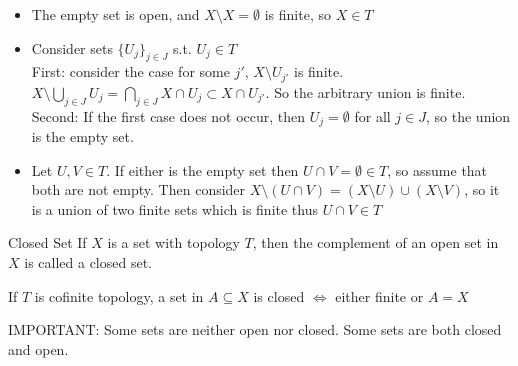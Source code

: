 \begin{proppf}
    \begin{itemize}
        \item The empty set is open, and $X\setminus X = \emptyset$ is finite, so $X \in T$
        \item Consider sets $\{U_j\}_{j \in J}$ s.t. $U_j \in T$\\
        First: consider the case for some $j'$, $X \setminus U_{j'}$ is finite.\\
        $X \setminus \bigcup_{j \in J} U_j=\bigcap_{j \in J}X \cap U_j \subset X \cap U_{j'}$. So the arbitrary union is finite.\\
        Second: If the first case does not occur, then $U_j = \emptyset$ for all $j \in J$, so the union is the empty set.
        \item Let $U,V \in T$. If either is the empty set then $U \cap V = \emptyset \in T$, so assume that both are not empty. Then consider $X\setminus(U \cap V)=(X\setminus U) \cup (X \setminus V)$, so it is a union of two finite sets
        which is finite thus $U \cap V \in T$
    \end{itemize}
\end{proppf}

\begin{definition}{Closed Set}{}
    If $X$ is a set with topology $T$, then the complement of an open set in $X$ is called a closed set.
\end{definition}

\begin{example*}{}{}
    If $T$ is cofinite topology, a set in $A \subseteq X$ is closed $\iff$ either finite or $A = X$
\end{example*}
{\LARGE IMPORTANT:}
Some sets are neither open nor closed. Some sets are both closed and open.